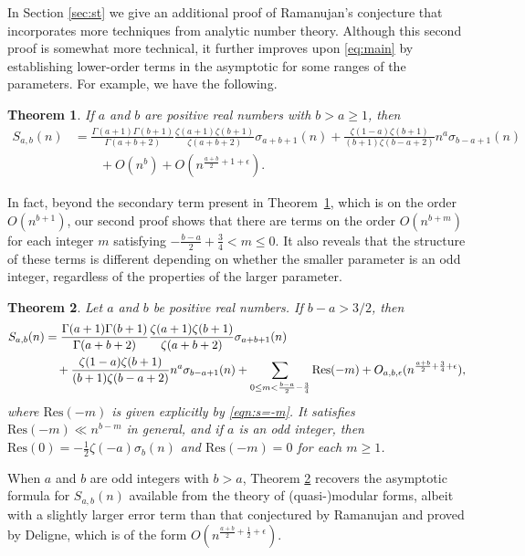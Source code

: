 \documentclass[12pt]{amsart}
\newtheorem{theorem}{Theorem}
\numberwithin{equation}{section}
\numberwithin{theorem}{section}
\begin{document}
\medskip
In Section \ref{sec:st} we give an additional proof of Ramanujan's conjecture that incorporates more techniques from analytic number theory. Although this second proof is somewhat more technical, it further improves upon \eqref{eq:main} by establishing lower-order terms in the asymptotic for some ranges of the parameters. For example, we have the following.

\begin{theorem} \label{thm:st1}
	If $a$ and $b$ are positive real numbers with $b>a \geq 1$, then
	\begin{align*}
		S_{a,b}(n) 
			&= \frac{\Gamma(a+1)\Gamma(b+1)}{\Gamma(a+b+2)}\frac{\zeta(a+1)\zeta(b+1)}{\zeta(a+b+2)}\sigma_{a+b+1}(n)  + \frac{\zeta(1-a)\zeta(b+1)}{(b+1)\zeta(b-a+2)}n^a\sigma_{b-a+1}(n) \\
			& \quad\quad+ O(n^b) + O(n^{\frac{a+b}{2}+1+\epsilon}).
	\end{align*}
\end{theorem}

In fact, beyond the secondary term present in Theorem~\ref{thm:st1}, which is on the order $O(n^{b+1})$, our second proof shows that there are terms on the order $O(n^{b+m})$ for each integer $m$ satisfying $-\frac{b-a}{2}+\frac{3}{4} < m \leq 0$. It also reveals that the structure of these terms is different depending on whether the smaller parameter is an odd integer, regardless of the properties of the larger parameter.

\begin{theorem}\label{thm:st2}
	Let $a$ and $b$ be positive real numbers.  If $b-a > 3/2$, then
	\begin{align*}
		S_{a,b}(n) 
			&= \frac{\Gamma(a+1)\Gamma(b+1)}{\Gamma(a+b+2)}\frac{\zeta(a+1)\zeta(b+1)}{\zeta(a+b+2)}\sigma_{a+b+1}(n) \\ 
			\notag &\quad  + \frac{\zeta(1-a)\zeta(b+1)}{(b+1)\zeta(b-a+2)}n^a\sigma_{b-a+1}(n) 
			 + \sum_{0 \leq m < \frac{b-a}{2}-\frac{3}{4}} \mathrm{Res}(-m) + O_{a,b,\epsilon}(n^{\frac{a+b}{2}+\frac{3}{4}+\epsilon}),
	\end{align*}
	where $\mathrm{Res}(-m)$ is given explicitly by \eqref{eqn:s=-m}.  It satisfies $\mathrm{Res}(-m) \ll n^{b-m}$ in general, and if $a$ is an odd integer, then $\mathrm{Res}(0) = -\frac{1}{2}\zeta(-a)\sigma_b(n)$ and $\mathrm{Res}(-m)=0$ for each $m \geq 1$.
\end{theorem}

When $a$ and $b$ are odd integers with $b>a$, Theorem \ref{thm:st2} recovers the asymptotic formula for $S_{a,b}(n)$ available from the theory of (quasi-)modular forms, albeit with a slightly larger error term than that conjectured by Ramanujan and proved by Deligne, which is of the form $O(n^{\frac{a+b}{2}+\frac{1}{2}+\epsilon})$.  
\end{document}
